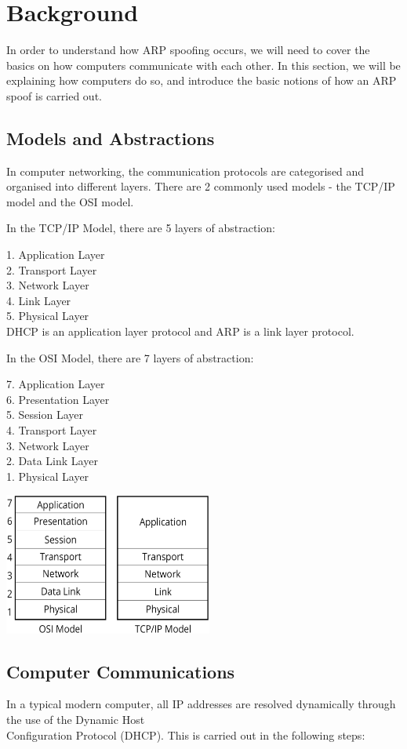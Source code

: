 \documentclass{acm_proc_article-sp}
\begin{document}
\section{Background}
In order to understand how ARP spoofing occurs, we will need to cover the basics on how computers communicate with each other. In this section, we will be explaining how computers do so, and introduce the basic notions of how an ARP spoof is carried out. 

\subsection{Models and Abstractions}
In computer networking, the communication protocols are categorised and organised into different layers. There are 2 commonly used models - the TCP/IP model and the OSI model. 

In the TCP/IP Model, there are 5 layers of abstraction: 

1. Application Layer\\
2. Transport Layer\\
3. Network Layer\\
4. Link Layer\\
5. Physical Layer\\

DHCP is an application layer protocol and ARP is a link layer protocol.

In the OSI Model, there are 7 layers of abstraction:

7. Application Layer \\
6. Presentation Layer \\
5. Session Layer \\
4. Transport Layer \\
3. Network Layer \\
2. Data Link Layer \\
1. Physical Layer 

\includegraphics[width=2.7in]{osi_comparison.eps}

\subsection{Computer Communications}
In a typical modern computer, all IP addresses are resolved dynamically through the use of the Dynamic Host \\Configuration Protocol (DHCP). This is carried out in the following steps\cite{kurose:networking}: \\
\end{document}

